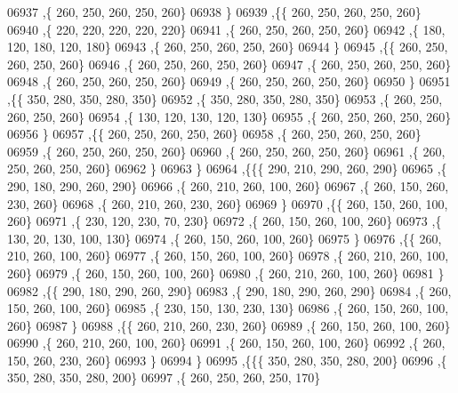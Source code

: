 \begin{DoxyCode}
06937     ,\{   260,   250,   260,   250,   260\}
06938     \}
06939    ,\{\{   260,   250,   260,   250,   260\}
06940     ,\{   220,   220,   220,   220,   220\}
06941     ,\{   260,   250,   260,   250,   260\}
06942     ,\{   180,   120,   180,   120,   180\}
06943     ,\{   260,   250,   260,   250,   260\}
06944     \}
06945    ,\{\{   260,   250,   260,   250,   260\}
06946     ,\{   260,   250,   260,   250,   260\}
06947     ,\{   260,   250,   260,   250,   260\}
06948     ,\{   260,   250,   260,   250,   260\}
06949     ,\{   260,   250,   260,   250,   260\}
06950     \}
06951    ,\{\{   350,   280,   350,   280,   350\}
06952     ,\{   350,   280,   350,   280,   350\}
06953     ,\{   260,   250,   260,   250,   260\}
06954     ,\{   130,   120,   130,   120,   130\}
06955     ,\{   260,   250,   260,   250,   260\}
06956     \}
06957    ,\{\{   260,   250,   260,   250,   260\}
06958     ,\{   260,   250,   260,   250,   260\}
06959     ,\{   260,   250,   260,   250,   260\}
06960     ,\{   260,   250,   260,   250,   260\}
06961     ,\{   260,   250,   260,   250,   260\}
06962     \}
06963    \}
06964   ,\{\{\{   290,   210,   290,   260,   290\}
06965     ,\{   290,   180,   290,   260,   290\}
06966     ,\{   260,   210,   260,   100,   260\}
06967     ,\{   260,   150,   260,   230,   260\}
06968     ,\{   260,   210,   260,   230,   260\}
06969     \}
06970    ,\{\{   260,   150,   260,   100,   260\}
06971     ,\{   230,   120,   230,    70,   230\}
06972     ,\{   260,   150,   260,   100,   260\}
06973     ,\{   130,    20,   130,   100,   130\}
06974     ,\{   260,   150,   260,   100,   260\}
06975     \}
06976    ,\{\{   260,   210,   260,   100,   260\}
06977     ,\{   260,   150,   260,   100,   260\}
06978     ,\{   260,   210,   260,   100,   260\}
06979     ,\{   260,   150,   260,   100,   260\}
06980     ,\{   260,   210,   260,   100,   260\}
06981     \}
06982    ,\{\{   290,   180,   290,   260,   290\}
06983     ,\{   290,   180,   290,   260,   290\}
06984     ,\{   260,   150,   260,   100,   260\}
06985     ,\{   230,   150,   130,   230,   130\}
06986     ,\{   260,   150,   260,   100,   260\}
06987     \}
06988    ,\{\{   260,   210,   260,   230,   260\}
06989     ,\{   260,   150,   260,   100,   260\}
06990     ,\{   260,   210,   260,   100,   260\}
06991     ,\{   260,   150,   260,   100,   260\}
06992     ,\{   260,   150,   260,   230,   260\}
06993     \}
06994    \}
06995   ,\{\{\{   350,   280,   350,   280,   200\}
06996     ,\{   350,   280,   350,   280,   200\}
06997     ,\{   260,   250,   260,   250,   170\}

\end{DoxyCode}
